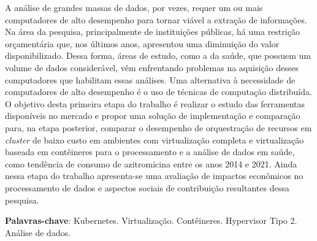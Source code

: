 
\begin{resumo}
    A análise de grandes massas de dados, por vezes, requer um ou mais computadores de alto desempenho para tornar viável a extração de informações. Na área da pesquisa, principalmente de instituições públicas, há uma restrição orçamentária que, nos últimos anos, apresentou uma diminuição do valor disponibilizado. Dessa forma, áreas de estudo, como a da saúde, que possuem um volume de dados considerável, vêm enfrentando problemas na aquisição desses computadores que habilitam essas análises. Uma alternativa à necessidade de computadores de alto desempenho é o uso de técnicas de computação distribuída. O objetivo desta primeira etapa do trabalho 
   é realizar o estudo das ferramentas disponíveis no mercado e propor uma solução de implementação e comparação para, na etapa posterior, comparar o desempenho de orquestração de recursos em \emph{cluster} de baixo custo em ambientes com virtualização completa e virtualização baseada em contêineres para o processamento e a análise de dados em saúde, como tendência de consumo de azitromicina entre os anos 2014 e 2021. Ainda nessa etapa do trabalho apresenta-se uma avaliação de impactos econômicos no processamento de dados e aspectos sociais de contribuição resultantes dessa pesquisa.

    \textbf{Palavras-chave}: Kubernetes\textregistered. Virtualização. Contêineres. Hypervisor Tipo 2. Análise de dados.
\end{resumo}

